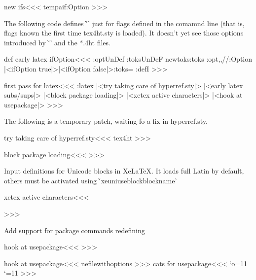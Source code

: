 \<new ifs\><<<
\:tempa{if:Option}
>>>



The following code defines \`'\ifOption' just for flags defined in the
comamnd line (that is, flags known the first time tex4ht.sty is
loaded).  It doesn't yet see those options introduced by \`'\Preamble'
and the *.4ht files.


\<def early latex ifOption\><<<
\ifx \config:opt\:UnDef \else
   \ifx\tmp:toks\:UnDeF    \csname newtoks\endcsname\tmp:toks\fi
   \def\:temp{\def\ifOption##1}
   \expandafter\expandafter\expandafter{}
        \expandafter{\config:opt,,//\if:Option
   |<ifOption true|>\else |<ifOption false|>\fi  \tmp:toks=}
   \pend:defI\ifOption{\def\:temp{##1}\:Optionfalse\:ScanOptions}
\fi
>>>



\<first pass for latex\><<<
\if:latex 
   |<try taking care of hyperref.sty|>
   |<early latex subs/sups|> 
\fi
|<block package loading|>
|<xetex active characters|>
|<hook at usepackage|>
>>>

The following is a temporary patch, waiting fo a fix in hyperref.sty.


\<try taking care of hyperref.sty\><<<
\expandafter\def\csname opt@hyperref.sty\endcsname{tex4ht}
>>>

\<block package loading\><<<
\def\:dontusepackage#1{%
  \typeout{tex4ht warning: package #1 was prevented from loading}
  \@namedef{ver@#1.sty}{9999/12/31}%
  \@namedef{opt@#1.sty}{\:currentoptions}
}
>>>

Input definitions for Unicode blocks in XeLaTeX. It loads full Latin by
default, others must be activated using \`'xeuniuseblock{blockname}'

\<xetex active characters\><<<
\ifx\XeTeXversion\@undefined\else
\ifx\xeuniuseblock\@undefined

\fi\fi
>>>

Add support for package commands redefining

\<hook at usepackage\><<<
\def\:AtEndOfPackage{\expandafter\g@addto@macro\csname pkg:end:hook:\@currname.sty\endcsname}
\def\init:package:hooks#1{\expandafter\def\csname pkg:end:hook:#1\endcsname{}}
\def\package:hooks#1{\csname pkg:end:hook:#1\endcsname}
>>>

\<hook at usepackage\><<<
\let\:onefilewithoptions\@onefilewithoptions
\def\@onefilewithoptions#1[#2][#3]#4{%
\init:package:hooks{#1.#4}%
   \let\:temp\@reset@ptions
   \def\@reset@ptions{%
      \let\@reset@ptions\:temp
      |<cats for usepackage|>\a:usepackage%
      \a:usepackage:lthooks{#1}{#4}
      |<recall usepackage cats|>}%
      \def\:currentoptions{#2}
\:onefilewithoptions#1[#2][#3]{#4}\package:hooks{#1.#4}}
\def\a:usepackage{ }
>>>
\<cats for usepackage\><<<
\edef\TivhTcats{%
   \catcode`:=\the\catcode`:%
   \catcode`@=\the\catcode`@}%
\catcode`\:=11 \catcode`\@=11
>>>


